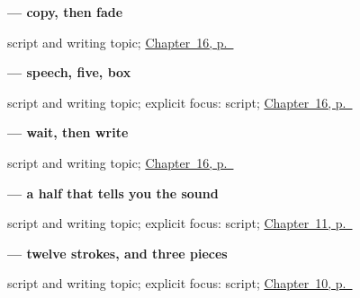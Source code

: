 \noindent\begin{minipage}[t]{\linewidth}
\raggedright
\textbf{ — copy, then fade}\par
\footnotesize script and writing topic; \hyperref[ch:zh-language-identity]{Chapter~16, p.~\pageref*{ch:zh-language-identity}}
\end{minipage}\par\smallskip

\noindent\begin{minipage}[t]{\linewidth}
\raggedright
\textbf{ — speech, five, box}\par
\footnotesize script and writing topic; explicit focus: script; \hyperref[ch:zh-language-identity]{Chapter~16, p.~\pageref*{ch:zh-language-identity}}
\end{minipage}\par\smallskip

\noindent\begin{minipage}[t]{\linewidth}
\raggedright
\textbf{ — wait, then write}\par
\footnotesize script and writing topic; \hyperref[ch:zh-language-identity]{Chapter~16, p.~\pageref*{ch:zh-language-identity}}
\end{minipage}\par\smallskip

\noindent\begin{minipage}[t]{\linewidth}
\raggedright
\textbf{ — a half that tells you the sound}\par
\footnotesize script and writing topic; explicit focus: script; \hyperref[ch:zh-qing]{Chapter~11, p.~\pageref*{ch:zh-qing}}
\end{minipage}\par\smallskip

\noindent\begin{minipage}[t]{\linewidth}
\raggedright
\textbf{ — twelve strokes, and three pieces}\par
\footnotesize script and writing topic; explicit focus: script; \hyperref[ch:zh-xiexie]{Chapter~10, p.~\pageref*{ch:zh-xiexie}}
\end{minipage}\par\smallskip
